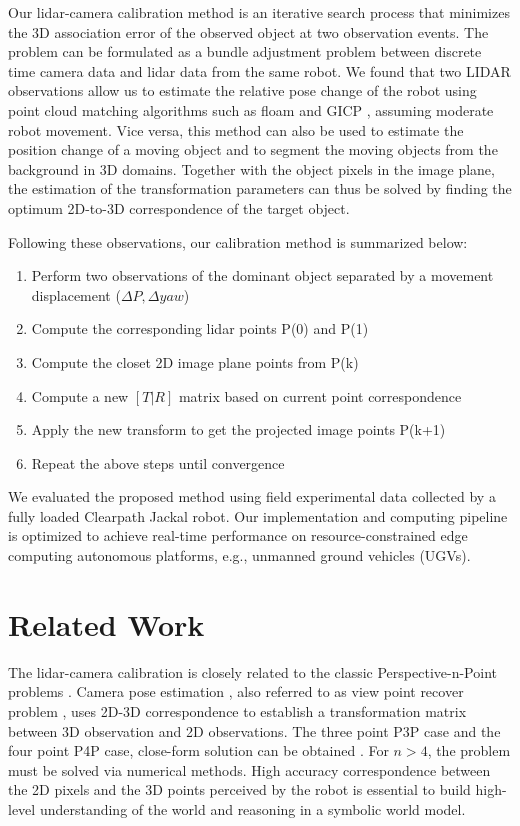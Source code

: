 \documentclass[journal]{IEEEtran}
\begin{document}
Our lidar-camera calibration method is an iterative search process that minimizes the 3D association error of the observed object at two observation events.
The problem can be formulated as a bundle adjustment problem between discrete time camera data and lidar data from the same robot. 
We found that two LIDAR observations allow us to estimate the relative pose change of the robot using point cloud matching algorithms such as floam \cite{ Zhang-2014-7903} and GICP \cite{gicp}, assuming moderate robot movement. Vice versa, this method can also be used to estimate the position change of a moving object and to segment the moving objects from the background in 3D domains.  Together with the object pixels in the image plane, the estimation of the transformation parameters can thus be solved by finding the optimum 2D-to-3D correspondence of the target object. 
 
Following these observations, our calibration method is summarized below:
\begin{enumerate}
    \item Perform two observations of the dominant object separated by a movement displacement ($\Delta P, \Delta yaw$)
    \item Compute the corresponding lidar points P(0) and P(1)
    \item Compute the closet 2D image plane points from P(k)
    \item Compute a new $[T|R]$ matrix based on current point correspondence
    \item Apply the new transform to get the projected image points P(k+1)
    \item Repeat the above steps until convergence
 \end{enumerate}

 
We evaluated the proposed method using field experimental data collected by a fully loaded Clearpath Jackal robot. Our implementation and computing pipeline is optimized to achieve real-time performance on resource-constrained edge computing autonomous platforms, e.g., unmanned ground vehicles (UGVs).

\section{Related Work}
The lidar-camera calibration is closely related to the classic Perspective-n-Point problems \cite{horn87, low91, quan99}. 
Camera pose estimation \cite{horn87}, also referred to as view point recover problem \cite{low91}, uses 2D-3D correspondence to establish a transformation matrix between 3D observation and 2D observations. The three point P3P case and the four point P4P case, close-form solution can be obtained \cite{horn87}. For $n>4$, the problem must be solved via numerical methods. High accuracy correspondence between the 2D pixels and the 3D points perceived by the robot is essential to build high-level understanding of the world and reasoning in a symbolic world model. 
\end{document}
